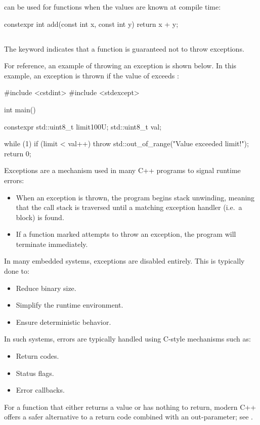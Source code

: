  can be used for functions when the values are known at compile time:

\begin{cppcode}
constexpr int add(const int x, const int y) { return x + y; }
\end{cppcode}

\subsection{}
\label{c1:sec:noexcept}
The keyword  indicates that a function is guaranteed not to throw exceptions.

For reference, an example of throwing an exception is shown below. In this example, an exception is
thrown if the value of  exceeds :

\begin{cppcode}
#include <cstdint>
#include <stdexcept>

int main()
{
    constexpr std::uint8_t limit{100U};
    std::uint8_t val{};

    while (1)
    {
        if (limit < val++)
        {
            throw std::out_of_range("Value exceeded limit!");
        }
    }
    return 0;
}
\end{cppcode}

\noindent Exceptions are a mechanism used in many C++ programs to signal runtime errors:
\begin{itemize}
  \item When an exception is thrown, the program begins stack unwinding, meaning that the call stack
    is traversed until a matching exception handler (i.e.\ a  block) is found.
  \item If a function marked  attempts to throw an exception, the program will
    terminate immediately.
\end{itemize}
In many embedded systems, exceptions are disabled entirely. This is typically done to:
\begin{itemize}
  \item Reduce binary size.
  \item Simplify the runtime environment.
  \item Ensure deterministic behavior.
\end{itemize}
In such systems, errors are typically handled using C-style mechanisms such as:
\begin{itemize}
  \item Return codes.
  \item Status flags.
  \item Error callbacks.
\end{itemize}
For a function that either returns a value or has nothing to return, modern C++ offers a safer
alternative to a return code combined with an out-parameter; see .

